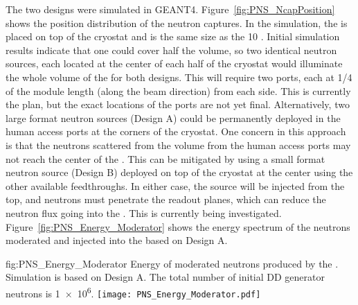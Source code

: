 The two designs were simulated in GEANT4. Figure~\ref{fig:PNS_NcapPosition} shows the position distribution of the neutron captures. In the simulation, the  is placed on top of the cryostat and is the same size as the  \SI{10}{\kton} .  Initial simulation results indicate that one  could cover half the  volume, so two identical neutron sources, each located at the center of each half of the cryostat
would illuminate the whole  volume of the   for both designs. This will require two ports, each at 1/4 of the module length (along the beam direction) from each side. This is currently the plan, but the exact locations of the ports are not yet final.
Alternatively, two large format neutron sources (Design A) could be permanently deployed in the human access ports at the corners of the cryostat. One concern in this approach is that the neutrons scattered from the  volume from the human access ports may not reach the center of the . This can be mitigated by using a small format neutron source (Design B) deployed on top of the cryostat at the center using the other available feedthroughs. %
In either case, the source will be injected from the top, and neutrons must penetrate the  readout planes, which can reduce the neutron flux going into the . %
This is currently being investigated.
Figure~\ref{fig:PNS_Energy_Moderator} shows the energy spectrum of the neutrons moderated and injected into the  based on Design A.



\begin{dunefigure}{fig:PNS_Energy_Moderator}
{Energy of moderated neutrons produced by the . Simulation is based on Design A. The total number of initial DD generator neutrons is \num{1e6}. }
\texttt{[image: PNS\_Energy\_Moderator.pdf]}
\end{dunefigure}

